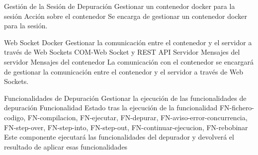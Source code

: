 \begin{component}{Gestión de la Sesión de Depuración}
{Gestionar un contenedor docker para la sesión}
{} %
{Acción sobre el contenedor} %
{\NA} %
{} %
Se encarga de gestionar un contenedor docker para la sesión. %
\end{component}


\begin{component}{Web Socket Docker}
{Gestionar la comunicación entre el contenedor y el servidor a través de Web Sockets}
{COM-Web Socket y REST API Servidor} %
{Mensajes del servidor} %
{Mensajes del contenedor} %
{} %
La comunicación con el contenedor se encargará de gestionar la comunicación entre el contenedor y el servidor a través de Web Sockets. %
\end{component}

\begin{component}{Funcionalidades de Depuración}
{Gestionar la ejecución de las funcionalidades de depuración}
{} %
{Funcionalidad} %
{Estado tras la ejecución de la funcionalidad} %
{FN-fichero-codigo, FN-compilacion, FN-ejecutar, FN-depurar, FN-aviso-error-concurrencia, FN-step-over, FN-step-into, FN-step-out, FN-continuar-ejecucion, FN-rebobinar} %
Este componente ejecutará las funcionalidades del depurador y devolverá el resultado de aplicar esas funcionalidades %
\end{component}


\FloatBarrier